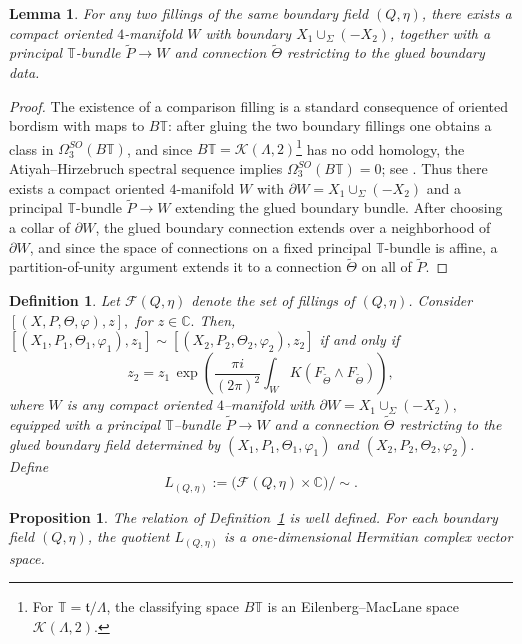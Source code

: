 \documentclass[12pt]{amsart}
\numberwithin{equation}{section}
\newtheorem{prop}[theorem]{Proposition}
\newtheorem{lemma}[theorem]{Lemma}
\newtheorem{definition}[theorem]{Definition}
\begin{document}
\begin{lemma}
For any two fillings of the same boundary field \((Q,\eta)\), there exists a compact
oriented \(4\)-manifold \(W\) with boundary \(X_1\cup_\Sigma(-X_2)\), together with a
principal \(\mathbb T\)-bundle \(\widetilde P\to W\) and connection \(\widetilde\Theta\)
restricting to the glued boundary data.
\end{lemma}
\begin{proof}
The existence of a comparison filling is a standard consequence of oriented bordism
with maps to \(B\mathbb T\): after gluing the two boundary fillings one obtains a class
in \(\Omega^{SO}_3(B\mathbb T)\), and since \(B\mathbb T=\mathcal K(\Lambda,2)\)\footnote{For \(\mathbb T=\mathfrak t/\Lambda\), the classifying space \(B\mathbb T\) is an Eilenberg--MacLane space \(\mathcal K(\Lambda,2)\).} has no odd
homology, the Atiyah--Hirzebruch spectral sequence implies
\(\Omega^{SO}_3(B\mathbb T)=0\); see \cite[\S 2.1]{AtiyahHirzebruch1961}.
Thus there exists a compact oriented \(4\)-manifold \(W\) with
\(\partial W=X_1\cup_\Sigma(-X_2)\) and a principal \(\mathbb T\)-bundle
\(\widetilde P\to W\) extending the glued boundary bundle. After choosing a collar of
\(\partial W\), the glued boundary connection extends over a neighborhood of
\(\partial W\), and since the space of connections on a fixed principal
\(\mathbb T\)-bundle is affine, a partition-of-unity argument extends it to a connection
\(\widetilde\Theta\) on all of \(\widetilde P\).
\end{proof}


\begin{definition}
\label{def:toral-boundary-line-filling}
Let $\mathscr F(Q,\eta)$ denote the set of fillings of $(Q,\eta)$.
Consider $[(X,P,\Theta,\varphi),z],$ for $z\in\mathbb C.$ Then, $[(X_1,P_1,\Theta_1,\varphi_1),z_1]
\sim
[(X_2,P_2,\Theta_2,\varphi_2),z_2]$
if and only if
\[
z_2
=
z_1\,
\exp\!\left(
\frac{\pi i}{(2\pi)^2}
\int_W K(F_{\widetilde\Theta}\wedge F_{\widetilde\Theta})
\right),
\]
where $W$ is any compact oriented $4$--manifold with $\partial W
=
X_1\cup_\Sigma (-X_2),$ equipped with a principal $\mathbb T$--bundle $\widetilde P\to W$ and a connection
$\widetilde\Theta$ restricting to the glued boundary field determined by
$(X_1,P_1,\Theta_1,\varphi_1)$ and $(X_2,P_2,\Theta_2,\varphi_2)$.
Define
\[
L_{(Q,\eta)}
:=
\bigl(\mathscr F(Q,\eta)\times \mathbb C\bigr)\big/\sim.
\]
\end{definition}

\begin{prop}
\label{prop:well-defined-boundary-line}
The relation of Definition~\ref{def:toral-boundary-line-filling} is well defined.
For each boundary field $(Q,\eta)$, the quotient $L_{(Q,\eta)}$ is a
one-dimensional Hermitian complex vector space.
\end{prop}
\end{document}
